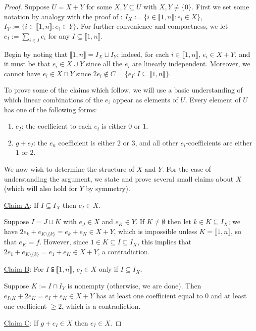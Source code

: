 \documentclass{report}
\newcommand{\llb}{\llbracket}
\newcommand{\rrb}{\rrbracket}
\renewcommand{\:}{\text{:}}
\theoremstyle{definition}
\begin{document}
\begin{proof}
Suppose $U = X + Y$ for some $X,Y\subseteq U$ with $X,Y\neq \{0\}$.
First we set some notation by analogy with the proof of \cite[Theorem 4.10]{fan-tringali18}: $I_X := \{i\in \llb 1,n \rrb: e_i\in X\}$, $I_Y := \{i\in \llb1,n \rrb: e_i\in Y \}$.
For further convenience and compactness, we let $e_I := \sum_{i\in I}e_i$ for any $I\subseteq \llb 1,n \rrb$.

Begin by noting that $\llb 1,n \rrb = I_X \sqcup I_Y$; indeed, for each $i\in\llb 1,n \rrb$, $e_i\in X+Y$, and it must be that $e_i\in X\cup Y$ since all the $e_i$ are linearly independent.  
Moreover, we cannot have $e_i\in X\cap Y$ since $2e_i \notin C = \{e_I : I\subseteq \llb 1,n \rrb \}$.

To prove some of the claims which follow, we will use a basic understanding of which linear combinations of the $e_i$ appear as elements of $U$.
Every element of $U$ has one of the following forms:
\begin{enumerate}[label={\rm (F\arabic{*})}]
\item $e_I$: the coefficient to each $e_i$ is either $0$ or $1$.
\item $g+e_I$: the $e_n$ coefficient is either $2$ or $3$, and all other $e_i$-coefficients are either $1$ or $2$.
\end{enumerate}

We now wish to determine the structure of $X$ and $Y$.
For the ease of understanding the argument, we state and prove several small claims about $X$ (which will also hold for $Y$ by symmetry).

\noindent\underline{Claim A}: If $I\subseteq I_X$ then $e_I\in X$. 

Suppose $I = J\sqcup K$ with $e_J\in X$ and $e_K\in Y$.
If $K\neq \emptyset$ then let $k\in K\subseteq I_X$; we have $2e_k + e_{K\setminus\{k\}} = e_k + e_K\in X+Y$, which is impossible unless $K = \llb 1,n\rrb$, so that $e_K = f$.
However, since $1\in K\subseteq I\subseteq I_X$, this implies that $2e_1 + e_{K\setminus\{k\}} = e_1 + e_K\in X+Y$, a contradiction.

\noindent\underline{Claim B}: For $I\subsetneqq \llb 1,n \rrb$, $e_I\in X$ only if $I\subseteq I_X$.

Suppose $K := I \cap I_Y$ is nonempty (otherwise, we are done).
Then $e_{I\setminus K} + 2e_K = e_I + e_K \in X +Y$ has at least one coefficient equal to $0$ and at least one coefficient $\ge 2$, which is a contradiction.

\noindent\underline{Claim C}: If $g + e_I\in X$ then $e_I\in X$. 


\end{proof}
\end{document}
